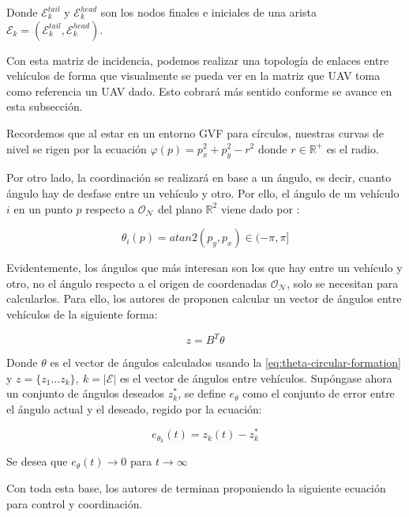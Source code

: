 Donde $\mathcal{E}^{tail}_{k}$ y $\mathcal{E}^{head}_{k}$ son los nodos finales e iniciales 
de una arista $\mathcal{E}_{k} = (\mathcal{E}^{tail}_{k}, \mathcal{E}^{head}_{k})$.

Con esta matriz de incidencia, podemos realizar una topología de enlaces entre vehículos de forma que
visualmente se pueda ver en la matriz que UAV toma como referencia un UAV dado.
Esto cobrará más sentido conforme se avance en esta subsección. 

Recordemos que al estar en un entorno GVF para círculos, nuestras curvas de nivel se rigen por la ecuación
$\varphi(p) = p_{x}^2 + p_{y}^2 - r^2$ donde $r \in \mathbb{R}^+$ es el radio.

Por otro lado, la coordinación se realizará en base a un ángulo, es decir, cuanto ángulo hay de desfase entre un vehículo y otro. 
Por ello, el ángulo de un vehículo $i$ en un punto $p$ respecto a $\mathcal{O}_\mathcal{N}$
del plano $\mathbb{R}^2$ viene dado por \cite{atan2}:

\begin{equation} \label{eq:theta-circular-formation}
    \theta_i(p) = atan2(p_y, p_x) \in (-\pi, \pi]
\end{equation}

Evidentemente, los ángulos que más interesan son los que hay entre un vehículo y otro, 
no el ángulo respecto a el origen de coordenadas $\mathcal{O}_\mathcal{N}$, 
solo se necesitan para calcularlos. 
Para ello, los autores de \cite{circular-formations} proponen calcular un vector de ángulos entre vehículos de la siguiente forma:

\begin{equation}
    z = B^T\theta
\end{equation}

Donde $\theta$ es el vector de ángulos calculados usando la \autoref{eq:theta-circular-formation}
y $z = \{z_1 \ldots z_k\}, \ k = |\mathcal{E}|$ es el vector de ángulos entre vehículos.
Supóngase ahora un conjunto de ángulos deseados $z^{*}_{k}$, se define $e_\theta$ como el conjunto de error
entre el ángulo actual y el deseado, regido por la ecuación:

\begin{equation}
    e_{\theta_k}(t) = z_k(t) - z_k^*
\end{equation}

Se desea que $e_\theta(t) \to 0$ para $t \to \infty$

Con toda esta base, los autores de \cite{circular-formations} terminan proponiendo la siguiente 
ecuación para control y coordinación.

